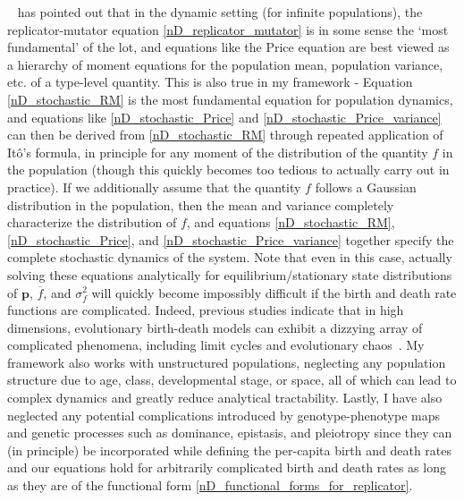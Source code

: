 ~\cite{lion_theoretical_2018} has pointed out that in the dynamic setting (for infinite populations), the replicator-mutator equation \eqref{nD_replicator_mutator} is in some sense the `most fundamental' of the lot, and equations like the Price equation are best viewed as a hierarchy of moment equations for the population mean, population variance, etc. of a type-level quantity. This is also true in my framework - Equation \eqref{nD_stochastic_RM} is the most fundamental equation for population dynamics, and equations like \eqref{nD_stochastic_Price} and \eqref{nD_stochastic_Price_variance} can then be derived from \eqref{nD_stochastic_RM} through repeated application of It\^o's formula, in principle for any moment of the distribution of the quantity $f$ in the population (though this quickly becomes too tedious to actually carry out in practice). If we additionally assume that the quantity $f$ follows a Gaussian distribution in the population, then the mean and variance completely characterize the distribution of $f$, and equations \eqref{nD_stochastic_RM}, \eqref{nD_stochastic_Price}, and \eqref{nD_stochastic_Price_variance} together specify the complete stochastic dynamics of the system. Note that even in this case, actually solving these equations analytically for equilibrium/stationary state distributions of $\mathbf{p}$, $\overline{f}$, and $\sigma^2_f$ will quickly become impossibly difficult if the birth and death rate functions are complicated. Indeed, previous studies indicate that in high dimensions, evolutionary birth-death models can exhibit a dizzying array of complicated phenomena, including limit cycles and evolutionary chaos~\citep{doebeli_diversity_2017}. My framework also works with unstructured populations, neglecting any population structure due to age, class, developmental stage, or space, all of which can lead to complex dynamics and greatly reduce analytical tractability. Lastly, I have also neglected any potential complications introduced by genotype-phenotype maps and genetic processes such as dominance, epistasis, and pleiotropy since they can (in principle) be incorporated while defining the per-capita birth and death rates and our equations hold for arbitrarily complicated birth and death rates as long as they are of the functional form \eqref{nD_functional_forms_for_replicator}.

